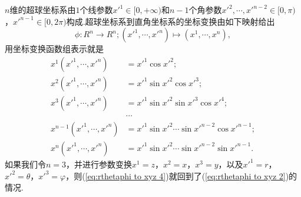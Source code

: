 	$n$维的超球坐标系由$1$个线参数$x'^1\in[0,+\infty)$和$n-1$个角参数$x'^2,\cdots,x'^{n-2}\in[0,\pi)$，$x'^{n-1}\in[0,2\pi)$构成.超球坐标系到直角坐标系的坐标变换由如下映射给出
	\begin{equation}\label{eq:rthetaphi to xyz 3}
		\phi:R^n\rightarrow R^n;(x'^1,\cdots,x'^n)\mapsto(x^1,\cdots,x^n),
	\end{equation}
	用坐标变换函数组表示就是
	\begin{equation}\label{eq:rthetaphi to xyz 4}
		\begin{split}
			x^1(x'^1,\cdots,x'^n)&=x'^1\cos x'^2;\\
			x^2(x'^1,\cdots,x'^n)&=x'^1\sin x'^2\cos x'^3;\\
			x^3(x'^1,\cdots,x'^n)&=x'^1\sin x'^2\sin x'^3\cos x'^4;\\
			&\cdots\\
			x^{n-1}(x'^1,\cdots,x'^n)&=x'^1\sin x'^2\cdots \sin x'^{n-2}\cos x'^{n-1};\\
			x^{n}(x'^1,\cdots,x'^n)&=x'^1\sin x'^2\cdots \sin x'^{n-2}\sin x'^{n-1}.
		\end{split}
	\end{equation}
	如果我们令$n=3$，并进行参数变换$x^1=z$，$x^2=x$，$x^3=y$，以及$x'^1=r$，$x'^2=\theta$，$x'^3=\varphi$，则(\ref{eq:rthetaphi to xyz 4})就回到了(\ref{eq:rthetaphi to xyz 2})的情况.

	
	
